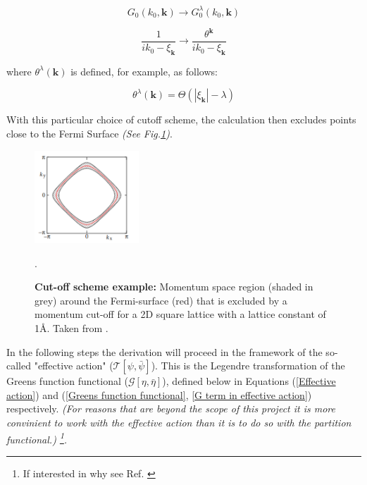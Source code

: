 \documentclass[12pt]{article}
\begin{document}
\begin{equation} \label{propagator transform 1}
    G_0(k_0, \textbf{k}) \rightarrow G_0^{\lambda}(k_0, \textbf{k})
\end{equation}


\begin{equation} \label{propagator transform 2}
    \frac{1}{ik_0 - \xi_{\textbf{k}}} \rightarrow \frac{\theta^{\textbf{k}}}{ik_0 - \xi_{\textbf{k}}}
\end{equation}

\noindent where $\theta^{\lambda}(\textbf{k})$ is defined, for example, as follows:

\begin{equation} \label{theta def}
    \theta^{\lambda}(\textbf{k}) = \Theta(|\xi_{\textbf{k}}| - \lambda)    
\end{equation}

\noindent With this particular choice of cutoff scheme, the calculation then excludes points close to the Fermi Surface \textit{(See Fig.\ref{fig:Truncation})}. \par
\begin{figure}[htbp]  %
    \centering
    \includegraphics[width=0.35\textwidth]{Truncation.png}  %
    \caption{\textbf{Cut-off scheme example:} Momentum space region (shaded in grey) around the Fermi-surface (red) that is excluded 
    by a momentum cut-off for a 2D square lattice with a lattice constant of 1\AA. Taken from \cite {metzner2012functional}.}.
    \label{fig:Truncation}
\end{figure}

\medskip
\noindent In the following steps the derivation will proceed in the framework of the  so-called "effective action" ($\mathcal{T}[\psi, \bar{\psi}]$).
This is the Legendre transformation of the Greens function functional ($\mathcal{G}[\eta, \bar{\eta}]$), defined below in Equations (\ref{Effective action})  and  (\ref{Greens function functional}, \ref{G term in effective action}) respectively. 
\textit{(For reasons that
are beyond the scope of this project it is more convinient to work with the effective action than it is to do so with the partition functional.) \footnote{If interested in why see Ref. \cite{metzner2012functional}}.}
\end{document}
